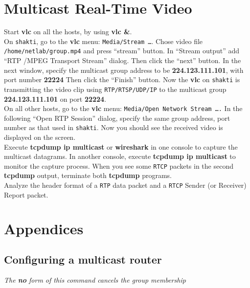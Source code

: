 \documentclass{../UTNetLab}
\begin{document}
\section{Multicast Real-Time Video}
    Start \textbf{vlc} on all the hosts, by using \textbf{vlc \&}. \\
    On \texttt{shakti}, go to the \textbf{vlc} menu: \texttt{Media/Stream \ldots }. Chose video file \texttt{/home/netlab/group.mp4} and press “stream” button. In “Stream output” add “RTP /MPEG Transport Stream” dialog.
    Then click the “next” button.
    In the next window, specify the multicast group address to be \textbf{224.123.111.101}, with port number \textbf{22224} %
    Then click the “Finish” button.
    Now the \textbf{vlc} on \texttt{shakti} is transmitting the video clip using \texttt{RTP/RTSP/UDP/IP} to the multicast group \textbf{224.123.111.101} on port \textbf{22224}. \\
    On all other hosts, go to the \textbf{vlc} menu: \texttt{Media/Open Network Stream \ldots.} In the following “Open RTP Session” dialog, specify the same group address, port number as that used in \texttt{shakti}.%
    Now you should see the received video is displayed on the screen. \\
    Execute \textbf{tcpdump ip multicast} or \textbf{wireshark} in one console to capture the multicast datagrams.
    In another console, execute \textbf{tcpdump ip multicast} to monitor the capture process.
    When you see some \texttt{RTCP} packets in the second \textbf{tcpdump} output, terminate both \textbf{tcpdump} programs. \\
    Analyze the header format of a \texttt{RTP} data packet and a \texttt{RTCP} Sender (or Receiver) Report packet.


    \appendix
\section*{Appendices}
\renewcommand{\thesubsection}{\Alph{subsection}}

\subsection{Configuring a multicast router}
\textit{The \textbf{no} form of this command cancels the group membership}
\end{document}
